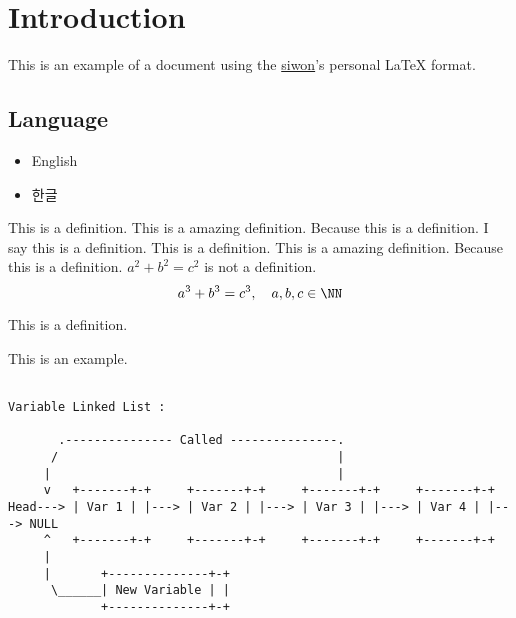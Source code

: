 \documentclass[../example.tex]{subfiles}
\begin{document}
\section{Introduction}
This is an example of a document using the \href{https://www.github.com/ysw421}{siwon}'s personal \LaTeX{} format.

\subsection{Language}
\begin{itemize}
	\item English
	\item 한글
\end{itemize}

\begin{definition}
  This is a definition.
  This is a amazing definition. Because this is a definition.
  I say this is a definition. This is a definition.
  This is a amazing definition. Because this is a definition.
  $a^2 + b^2 = c^2$ is not a definition.
  \begin{equation}
    a^3 + b^3 = c^3, \quad a,b,c \in \NN
  \end{equation}
\end{definition}
\begin{definition}
  This is a definition.
\end{definition}
\begin{example}[하위!]
  This is an example.
\begin{center}
  \small
  \begin{spacing}{0.8}
    \begin{BVerbatim}

Variable Linked List :

       .--------------- Called ---------------.
      /                                       |
     |                                        |
     v   +-------+-+     +-------+-+     +-------+-+     +-------+-+
Head---> | Var 1 | |---> | Var 2 | |---> | Var 3 | |---> | Var 4 | |---> NULL
     ^   +-------+-+     +-------+-+     +-------+-+     +-------+-+
     |
     |       +--------------+-+
      \______| New Variable | |
             +--------------+-+

    \end{BVerbatim}
  \end{spacing}
\end{center}
\end{example}
\end{document}
